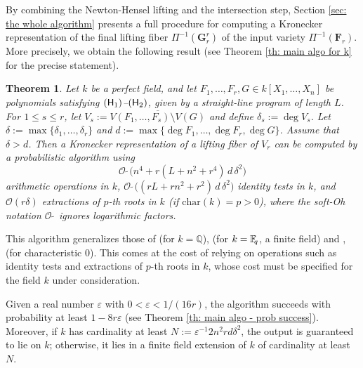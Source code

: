 \documentclass[pdflatex,sn-basic]{sn-jnl}%
\theoremstyle{thmstyleone}%
\newtheorem{theorem}{Theorem}%
\theoremstyle{thmstyletwo}%
\theoremstyle{thmstylethree}%
\theoremstyle{definition}
\numberwithin{equation}{section}
\newcommand{\bfs}{\boldsymbol}
\newcommand{\F}{\mathbb F}
\newcommand{\Q}{\mathbb Q}
\newcommand{\fq}{\F_{\hskip-0.7mm q}}
\begin{document}
By combining the Newton-Hensel lifting and the intersection step,
Section \ref{sec: the whole algorithm} presents a full procedure for computing a
Kronecker representation of the final lifting fiber $\Pi^{-1}(\bfs G_r^r)$ of the
input variety $\Pi^{-1}(\bfs F_r)$. More precisely, we obtain
the following result (see Theorem \ref{th: main algo for k} for the precise statement).
%
\begin{theorem}\label{th: algo intro}
Let $k$ be a perfect field, and let $F_1,\ldots,F_r,G\in
k[X_1,\ldots,X_n]$ be polynomials satisfying $({\sf H}_1)$--$({\sf
H}_2)$, given by a straight-line program of length $L$. For $1\le
s\le r$, let $V_s:=\overline{V(F_1,\ldots,F_s)\setminus V(G)}$ and
define $\delta_s:=\deg V_s$. Let $\delta:=\max\{\delta_1,\ldots,
\delta_r\}$ and $d:=\max\{\deg F_1,\ldots,\deg F_r,\deg G\}$. Assume
that $\delta>d$. Then a Kronecker representation of a lifting fiber
of $V_r$ can be computed by a probabilistic algorithm using
%
$$\mathcal{O}\,\widetilde{\ }\big(n^4+r(L+n^2+r^4)\,d\,\delta^2\big)
$$
%
arithmetic operations in $k$,
$\mathcal{O}\,\widetilde{\ }\big((rL+rn^2+r^2)\,d\,\delta^2\big)$
%
identity tests in $k$, and $\mathcal{O}(r\delta)$
extractions of $p$-th roots in $k$  (if $\mathrm{char}(k)=p>0$),
where the soft-Oh notation $\mathcal{O}\,\widetilde{\ }$ ignores
logarithmic factors.
\end{theorem}

This algorithm generalizes those of \cite{HeMaWa01} (for $k=\Q$),
\cite{CaMa06a} (for $k=\fq$, a finite field) and \cite{GiLeSa01}, \cite{DuLe08}
(for characteristic 0). This comes at the cost of relying
on operations such as identity tests and extractions of $p$-th roots in $k$,
whose cost must be specified for the field $k$ under consideration.

Given
a real number $\varepsilon$ with $0<\varepsilon<1/(16r)$, the algorithm succeeds
with probability at least
$1-8r\varepsilon$ (see Theorem \ref{th: main algo - prob success}). Moreover,
if $k$ has cardinality at least $N:=\varepsilon^{-1}2n^2rd\delta^2$, the
output is guaranteed to lie on $k$; otherwise, it lies in
a finite field extension of $k$ of cardinality at least $N$.
\end{document}
